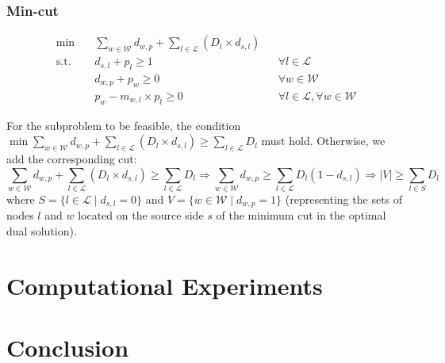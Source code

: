 \documentclass[preprint, authoryear,11pt]{elsarticle}
\begin{document}
\subsubsection{Min-cut}
\begin{align}
    \min \quad & \sum_{w \in \mathcal{W}} d_{w,p} + \sum_{ l \in \mathcal{L}}( D_l \times d_{s,l}) \label{obj_dual2} \\
    \text{s.t.} \quad & d_{s,l}+p_{l} \geq 1 && \forall l \in \mathcal{L} \label{dsl}\\
    & d_{w,p}+p_{w} \geq 0 && \forall w \in \mathcal{W} \label{dwp}\\
    & p_{w} - m_{w,l} \times p_{l} \geq 0 && \forall l \in \mathcal{L},\forall w \in \mathcal{W}
\end{align}

For the subproblem to be feasible, the condition $\min \sum_{w \in \mathcal{W}} d_{w,p} + \sum_{ l \in \mathcal{L}}( D_l \times d_{s,l}) \geq \sum_{ l \in \mathcal{L}} D_l$ must hold. Otherwise, we add the corresponding cut: 
$$ \sum_{w \in \mathcal{W}} d_{w,p} + \sum_{ l \in \mathcal{L}}( D_l \times d_{s,l}) \geq \sum_{ l \in \mathcal{L}} D_l \Rightarrow \sum_{w \in \mathcal{W}} d_{w,p}  \geq \sum_{ l \in \mathcal{L}} D_l (1 - d_{s,l}) \Rightarrow |V|  \geq \sum_{ l \in S} D_l $$
where $S = \{ l \in \mathcal{L} \mid d_{s,l} = 0\}$ and $V = \{ w \in \mathcal{W} \mid d_{w,p} = 1\}$ (representing the sets of nodes $l$ and $w$ located on the source side $s$ of the minimum cut in the optimal dual solution).

\section{Computational Experiments}                  \label{sec:compexp}

\section{Conclusion}
\label{sec:conclusion}



\end{document}
